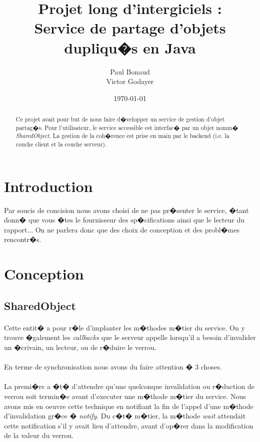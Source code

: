 \documentclass[]{report}   %
\begin{document}
\title{Projet long d'intergiciels : \\Service de partage d'objets
  dupliqu�s en Java}   %
\author{Paul Bonaud\\Victor Godayer}         %
\date\today    %
\maketitle

\begin{abstract}
  Ce projet avait pour but de nous faire d�velopper un service de gestion
  d'objet partag�s.
  Pour l'utilisateur, le service accessible est interfac� par un objet
  nomm� \textit{SharedObject}.
  La gestion de la coh�rence est prise en main par le backend (i.e. la couche
  client et la couche serveur).
\end{abstract}

\section{Introduction}
Par soucis de concision nous avons choisi de ne pas pr�senter le
service, �tant donn� que vous �tes le fournisseur des sp�cifications
ainsi que le lecteur du rapport...
On ne parlera donc que des choix de conception et des probl�mes rencontr�s.


\section{Conception}
\subsection{SharedObject}

\paragraph{}
Cette entit� a pour r�le d'implanter les m�thodes m�tier du service. 
On y trouve �galement les \textit{callbacks} que le
serveur appelle lorsqu'il a besoin d'invalider un �crivain, un
lecteur, ou de r�duire le verrou.

\paragraph{}
En terme de synchronisation nous avons du faire attention � 3
choses.

\paragraph{}
La premi�re a �t� d'attendre qu'une quelconque invalidation ou
r�duction de verrou soit termin�e avant d'executer une m�thode m�tier
du service.
Nous avons mis en oeuvre cette technique en notifiant la fin de
l'appel d'une m�thode d'invalidation gr�ce � \textit{notify}.
Du c�t� m�tier, la m�thode \textit{wait} attendait cette notification
s'il y avait lieu d'attendre, avant d'op�rer dans la modification de
la valeur du verrou.
\end{document}
